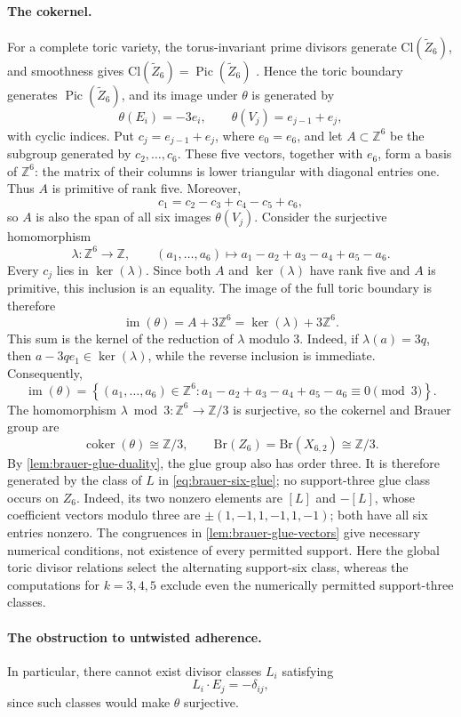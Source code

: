 \documentclass[11pt]{article}
\theoremstyle{plain}
\theoremstyle{definition}
\theoremstyle{remark}
\newcommand{\Z}{\mathbb Z}
\newcommand{\Pic}{\operatorname{Pic}}
\newcommand{\Cl}{\mathrm{Cl}}
\newcommand{\Br}{\mathrm{Br}}
\begin{document}
\paragraph{The cokernel.}
For a complete toric variety, the torus-invariant prime divisors generate
\(\Cl(\widetilde Z_6)\), and smoothness gives
\(\Cl(\widetilde Z_6)=\Pic(\widetilde Z_6)\)
\cite[Theorem~4.1.3]{CoxLittleSchenck2011}. Hence the toric boundary generates
\(\Pic(\widetilde Z_6)\), and its image under \(\theta\) is generated by
\[
\theta(E_i)=-3e_i,
\qquad
\theta(V_j)=e_{j-1}+e_j,
\]
with cyclic indices. Put \(c_j=e_{j-1}+e_j\), where \(e_0=e_6\), and let
\(A\subset\Z^6\) be the subgroup generated by \(c_2,\dots,c_6\).
These five vectors, together with \(e_6\), form a basis of \(\Z^6\):
the matrix of their columns is lower triangular with diagonal entries one.
Thus \(A\) is primitive of rank five. Moreover,
\[
c_1=c_2-c_3+c_4-c_5+c_6,
\]
so \(A\) is also the span of all six images \(\theta(V_j)\). Consider the
surjective homomorphism
\[
\lambda:\Z^6\longrightarrow\Z,
\qquad
(a_1,\dots,a_6)\longmapsto
a_1-a_2+a_3-a_4+a_5-a_6.
\]
Every \(c_j\) lies in \(\ker(\lambda)\). Since both
\(A\) and \(\ker(\lambda)\) have rank five and \(A\) is primitive,
this inclusion is an equality. The image of the full toric boundary is
therefore
\[
\operatorname{im}(\theta)
=
A+3\Z^6
=
\ker(\lambda)+3\Z^6.
\]
This sum is the kernel of the reduction of \(\lambda\) modulo \(3\). Indeed,
if \(\lambda(a)=3q\), then \(a-3q e_1\in\ker(\lambda)\), while the reverse
inclusion is immediate. Consequently,
\[
\operatorname{im}(\theta)
=
\left\{
(a_1,\dots,a_6)\in\Z^6:
a_1-a_2+a_3-a_4+a_5-a_6\equiv0\pmod3
\right\}.
\]
The homomorphism \(\lambda\bmod3:\Z^6\to\Z/3\) is surjective, so the
cokernel and Brauer group are
\[
\operatorname{coker}(\theta)\cong\Z/3,
\qquad
\Br(Z_6)=\Br(X_{6,2})\cong\Z/3.
\]
By \cref{lem:brauer-glue-duality}, the glue group also has order three.
It is therefore generated by the class of \(L\) in
\eqref{eq:brauer-six-glue}; no support-three glue class occurs on \(Z_6\).
Indeed, its two nonzero elements are \([L]\) and \(-[L]\), whose
coefficient vectors modulo three are
\(\pm(1,-1,1,-1,1,-1)\); both have all six entries nonzero.
The congruences in \cref{lem:brauer-glue-vectors} give necessary
numerical conditions, not existence of every permitted support.
Here the global toric divisor relations select the alternating
support-six class, whereas the computations for \(k=3,4,5\) exclude
even the numerically permitted support-three classes.

\paragraph{The obstruction to untwisted adherence.}
In particular, there cannot exist divisor classes \(L_i\) satisfying
\[
L_i\cdot E_j=-\delta_{ij},
\]
since such classes would make \(\theta\) surjective.
\end{document}
